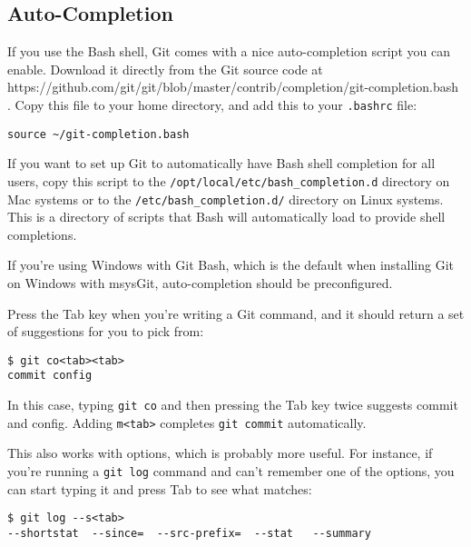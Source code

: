 \documentclass[a4paper]{book}
\newcounter{tab}[chapter]
\begin{document}
\subsection{Auto-Completion}\label{auto-completion}

If you use the Bash shell, Git comes with a nice auto-completion script you can enable. Download it directly from the Git source code at https://github.com/git/git/blob/master/contrib/completion/git-completion.bash . Copy this file to your home directory, and add this to your \texttt{.bashrc} file:

\begin{shaded}\begin{verbatim}
source ~/git-completion.bash
\end{verbatim}\end{shaded}

If you want to set up Git to automatically have Bash shell completion for all users, copy this script to the \texttt{/opt/local/etc/bash\_completion.d} directory on Mac systems or to the \texttt{/etc/bash\_completion.d/} directory on Linux systems. This is a directory of scripts that Bash will automatically load to provide shell completions.

If you're using Windows with Git Bash, which is the default when installing Git on Windows with msysGit, auto-completion should be preconfigured.

Press the Tab key when you're writing a Git command, and it should return a set of suggestions for you to pick from:

\begin{shaded}\begin{verbatim}
$ git co<tab><tab>
commit config
\end{verbatim}\end{shaded}

In this case, typing \texttt{git co} and then pressing the Tab key twice suggests commit and config. Adding \texttt{m\textless{}tab\textgreater{}} completes \texttt{git commit} automatically.

This also works with options, which is probably more useful. For instance, if you're running a \texttt{git log} command and can't remember one of the options, you can start typing it and press Tab to see what matches:

\begin{shaded}\begin{verbatim}
$ git log --s<tab>
--shortstat  --since=  --src-prefix=  --stat   --summary
\end{verbatim}\end{shaded}
\end{document}
